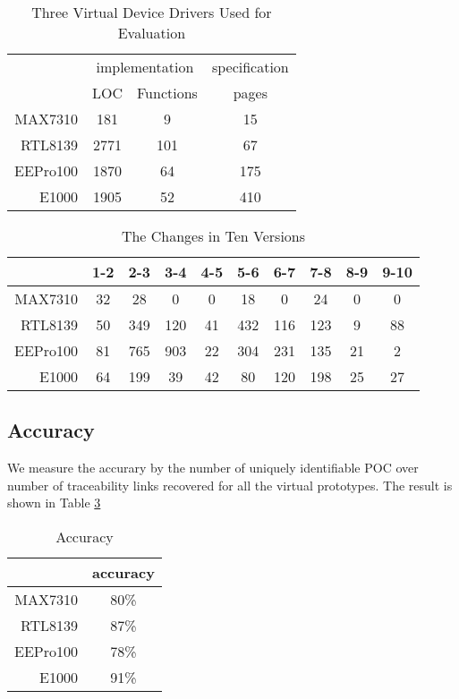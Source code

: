 \begin{table}[th]
\caption{Three Virtual Device Drivers Used for Evaluation}
\centering
\begin{tabular*}{0.6\textwidth}{@{\extracolsep{\fill}}rccc}
\hline
 & \multicolumn{2}{c}{implementation} & specification \\
\cline{2-4}
 & LOC & Functions & pages \\
\hline
MAX7310 & 181 & 9 & 15\\
RTL8139  & 2771 & 101 & 67\\
EEPro100  & 1870 & 64 & 175\\
E1000  & 1905 & 52 & 410\\
\hline
\end{tabular*}
\label{table:vdd}
\end{table}


\begin{table}[th]
\caption{The Changes in Ten Versions}
\centering
\begin{tabular*}{0.9\textwidth}{@{\extracolsep{\fill}}rccccccccc}
\hline
 & 1-2 & 2-3 & 3-4 & 4-5 & 5-6 & 6-7 & 7-8 & 8-9 & 9-10 \\
\hline
MAX7310 & 32 & 28 & 0 & 0 & 18 & 0 & 24 & 0 & 0\\
RTL8139 & 50 & 349 & 120 & 41 & 432 & 116 & 123 & 9 & 88\\
EEPro100 & 81 & 765 & 903 & 22 & 304 & 231 & 135 & 21 & 2\\
E1000 & 64 & 199 & 39 & 42 & 80 & 120 & 198 & 25 & 27\\
\hline
\end{tabular*}
\label{table:version}
\end{table}

\subsection{Accuracy}
We measure the accurary by the number of uniquely identifiable POC over number of traceability links recovered for all the virtual prototypes. The result is shown in Table \ref{table:accuracy}

\begin{table}[th]
\caption{Accuracy}
\centering
\begin{tabular*}{0.3\textwidth}{@{\extracolsep{\fill}}rc}
\hline
 & accuracy \\
\hline
MAX7310 & 80\%\\
RTL8139  & 87\%\\
EEPro100  & 78\%\\
E1000  & 91\%\\
\hline
\end{tabular*}
\label{table:accuracy}
\end{table}

